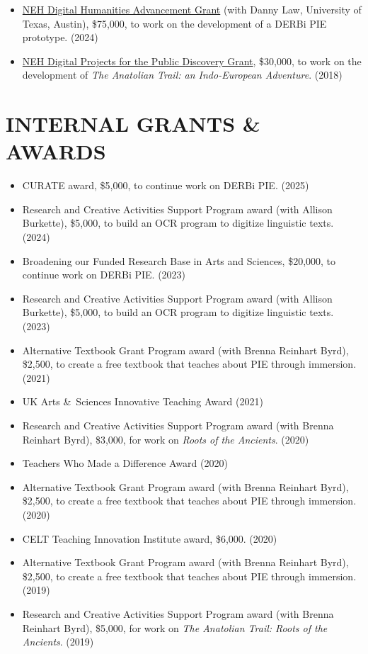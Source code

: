 \documentclass[paper=letter,fontsize=11pt]{scrartcl} %
\newcommand{\NewPart}[2]{\section*{\uppercase{#1} #2}}
\begin{document}
\begin{itemize}
\item \href{https://apps.neh.gov/PublicQuery/AwardDetail.aspx?gn=HAA-303944-25}{NEH Digital Humanities Advancement Grant} (with Danny Law, University of Texas, Austin), \$75,000, to work on the development of a DERBi PIE prototype. (2024)
\item \href{https://apps.neh.gov/publicquery/AwardDetail.aspx?gn=MD-263922-19}{NEH Digital Projects for the Public Discovery Grant}, \$30,000, to work on the development of \textit{The Anatolian Trail: an Indo-European Adventure}. (2018)
\end{itemize}


\NewPart{Internal Grants \& Awards}{}
\begin{itemize}
\item CURATE award, \$5,000, to continue work on DERBi PIE. (2025)
\item Research and Creative Activities Support Program award (with Allison Burkette), \$5,000, to build an OCR program to digitize linguistic texts. (2024)
\item Broadening our Funded Research Base in Arts and Sciences, \$20,000, to continue work on DERBi PIE. (2023)
\item Research and Creative Activities Support Program award (with Allison Burkette), \$5,000, to build an OCR program to digitize linguistic texts. (2023)
\item Alternative Textbook Grant Program award (with Brenna Reinhart Byrd), \$2,500, to create a free textbook that teaches about PIE through immersion. (2021)
\item UK Arts \&~Sciences Innovative Teaching Award (2021)
\item Research and Creative Activities Support Program award (with Brenna Reinhart Byrd), \$3,000, for work on {\it Roots of the Ancients}. (2020)
\item Teachers Who Made a Difference Award (2020)
\item Alternative Textbook Grant Program award (with Brenna Reinhart Byrd), \$2,500, to create a free textbook that teaches about PIE through immersion. (2020)
\item CELT Teaching Innovation Institute award, \$6,000. (2020)
\item Alternative Textbook Grant Program award (with Brenna Reinhart Byrd), \$2,500, to create a free textbook that teaches about PIE through immersion. (2019)
\item Research and Creative Activities Support Program award (with Brenna Reinhart Byrd), \$5,000, for work on {\it The Anatolian Trail: Roots of the Ancients}. (2019)

\end{itemize}
\end{document}
